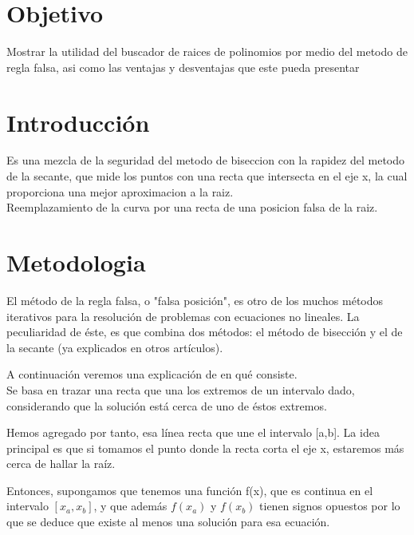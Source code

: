 \documentclass{article}
\begin{document}
\begin{multicols}{2}

\section{Objetivo}
\label{sec:obj}
  Mostrar la utilidad del buscador de raices de polinomios por medio del metodo de regla falsa, asi como las ventajas y desventajas que este pueda presentar

\section{Introducción}
\label{sec:intro}
Es una mezcla de la seguridad del metodo de biseccion con la rapidez del metodo de la secante, que mide los puntos con una recta que intersecta en el eje x, la cual proporciona una mejor aproximacion a la raiz.
\\
Reemplazamiento de la curva por una recta de una posicion falsa de la raiz.
\section{Metodologia}
\label{sec:Met}
El método de la regla falsa, o "falsa posición", es otro de los muchos métodos iterativos para la resolución de problemas con ecuaciones no lineales. La peculiaridad de éste, es que combina dos métodos: el método de bisección y el de la secante (ya explicados en otros artículos).

A continuación veremos una explicación de en qué consiste.
\\
Se basa en trazar una recta que una los extremos de un intervalo dado, considerando que la solución está cerca de uno de éstos extremos.

Hemos agregado por tanto, esa línea recta que une el intervalo [a,b]. La idea principal es que si tomamos el punto donde la recta corta el eje x, estaremos más cerca de hallar la raíz.

Entonces, supongamos que tenemos una función f(x), que es continua en el intervalo $[x_{a}, x_{b}]$, y que además $f(x_{a})$ y $f(x_{b})$ tienen signos opuestos por lo que se deduce que existe al menos una solución para esa ecuación.



\end{multicols}
\end{document}
